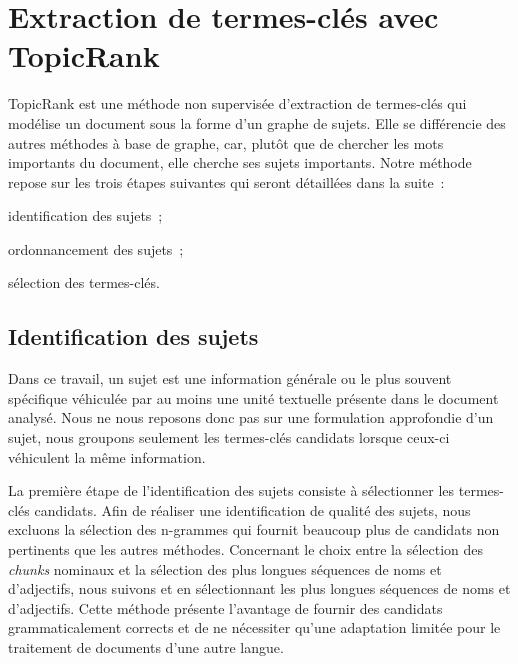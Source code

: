 \section{Extraction de termes-clés avec TopicRank}
\label{sec:extraction_de_termes_cles_avec_topicrank}
  TopicRank est une méthode non supervisée d'extraction de termes-clés qui
  modélise un document sous la forme d'un graphe de sujets.
  Elle se différencie des autres méthodes à base de graphe, car, plutôt que de
  chercher les mots importants du document, elle cherche ses sujets importants.
  Notre méthode repose sur les trois étapes suivantes qui seront détaillées dans
  la suite~:
  \begin{itemize*}
    \item[]{identification des sujets~;}
    \item[]{ordonnancement des sujets~;}
    \item[]{sélection des termes-clés.}
  \end{itemize*}

  \subsection{Identification des sujets}
  \label{subsec:identification_des_sujets}
    Dans ce travail, un sujet est une information générale ou le plus souvent
    spécifique véhiculée par au moins une unité textuelle présente dans le
    document analysé. Nous ne nous reposons donc pas sur une formulation
    approfondie d'un sujet, nous groupons seulement les termes-clés candidats
    lorsque ceux-ci véhiculent la même information.

    La première étape de l'identification des sujets consiste à sélectionner les
    termes-clés candidats.
    Afin de réaliser une identification de qualité des sujets, nous excluons la
    sélection des n-grammes qui fournit beaucoup plus de candidats non
    pertinents que les autres méthodes. Concernant le choix entre la sélection
    des \textit{chunks} nominaux et la sélection des plus longues séquences de
    noms et d'adjectifs, nous suivons  et
     en sélectionnant les plus longues séquences
    de noms et d'adjectifs. Cette méthode présente l'avantage de fournir des
    candidats grammaticalement corrects et de ne nécessiter qu'une adaptation
    limitée pour le traitement de documents d'une autre langue.

